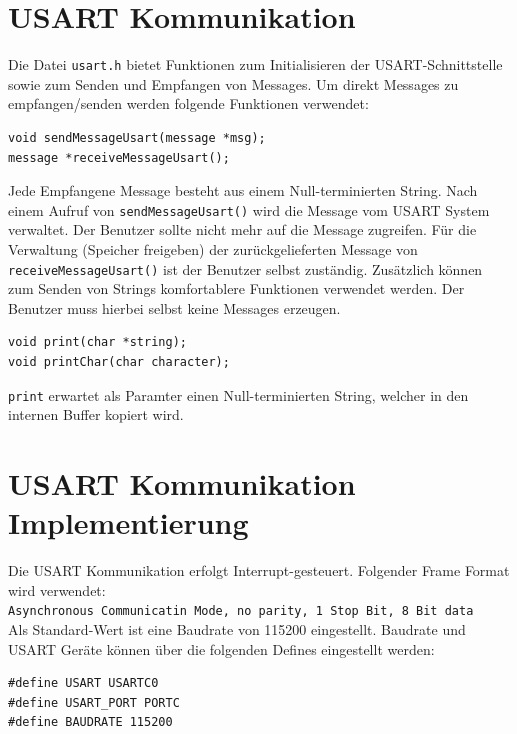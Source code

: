 \documentclass[fontsize=12pt, toc=bibliography, notitlepage]{scrreprt}
\begin{document}
\section{USART Kommunikation}
\label{subsec:shell-communication}
Die Datei \lstinline$usart.h$ bietet Funktionen zum Initialisieren der USART-Schnittstelle sowie zum Senden und Empfangen von Messages. Um direkt Messages zu empfangen/senden werden folgende Funktionen verwendet:\\

\begin{lstlisting}
void sendMessageUsart(message *msg);
message *receiveMessageUsart();
\end{lstlisting}

Jede Empfangene Message besteht aus einem Null-terminierten String. Nach einem Aufruf von \lstinline$sendMessageUsart()$ wird die Message vom USART System verwaltet. Der Benutzer sollte nicht mehr auf die Message zugreifen. Für die Verwaltung (Speicher freigeben) der zurückgelieferten Message von \lstinline$receiveMessageUsart()$ ist der Benutzer selbst zuständig. Zusätzlich können zum Senden von Strings komfortablere Funktionen verwendet werden. Der Benutzer muss hierbei selbst keine Messages erzeugen.\\

\begin{lstlisting}
void print(char *string);
void printChar(char character);
\end{lstlisting}

\lstinline$print$ erwartet als Paramter einen Null-terminierten String, welcher in den internen Buffer kopiert wird.

\section{USART Kommunikation Implementierung}
\label{subsec:shell-communication-impl}
Die USART Kommunikation erfolgt Interrupt-gesteuert. Folgender Frame Format wird verwendet:\\

\lstinline$Asynchronous Communicatin Mode, no parity, 1 Stop Bit, 8 Bit data$\\

Als Standard-Wert ist eine Baudrate von 115200 eingestellt. Baudrate und USART Geräte können über die folgenden Defines eingestellt werden:\\

\begin{lstlisting}
#define USART USARTC0
#define USART_PORT PORTC
#define BAUDRATE 115200
\end{lstlisting}
\end{document}
